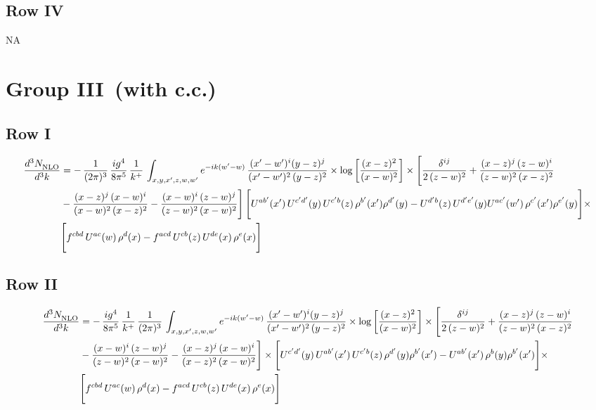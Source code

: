 \documentclass[9pt]{article}
\numberwithin{equation}{section}
\begin{document}
\subsection{Row IV}
\textsc{NA}
\section{Group III\, (with c.c.)}
\subsection{Row I}
\begin{align}
     \frac{d^{3}N_{\rm NLO}^{\rm}}{d^{3}k}  & =   -\,\frac{1}{(2\pi)^{3}}\, \frac{ig^{4}}{8\pi^{5}}\,\frac{1}{k^{+}}\,\int_{x,y,x',z,w,w^{\prime}} e^{-ik(w^{\prime}-w)}\,\frac{(x'-w')^{i}(y-z)^{j}}{(x'-w')^{2}\,(y-z)^{2}}\times \log{\left[\frac{(x-z)^{2}}{(x-w)^{2}}\right]}\times \Bigg[\frac{\delta^{ij}}{2\,(z-w)^{2}}+\frac{(x-z)^{j}\,(z-w)^{i}}{(z-w)^{2}\,(x-z)^{2}}\notag \\ & -\frac{(x-z)^{j}\,(x-w)^{i}}{(x-w)^{2}\,(x-z)^{2}}-\frac{(x-w)^{i}\,(z-w)^{j}}{(z-w)^{2}\,(x-w)^{2}}\Bigg]\, \Bigg[U^{ab'}(x')\,U^{c'd'}(y)\,U^{c'b}(z)\,\rho^{b'}(x')\rho^{d'}(y)-U^{d'b}(z)\,U^{d'e'}(y)U^{ac'}(w')\,\rho^{c'}(x')\rho^{e'}(y)\Bigg]\times\notag \\ & \Bigg[f^{cbd}\,U^{ac}(w)\,\rho^{d}(x)-f^{acd}\, U^{cb}(z)\,U^{de}(x)\,\rho^{e}(x)\Bigg]
\end{align}
\subsection{Row II}
\begin{align}
     \frac{d^{3}N_{\rm NLO}^{\rm}}{d^{3}k}  & =    
 -\,\frac{ig^{4}}{8\pi^{5}}\,\frac{1}{k^{+}}\,\frac{1}{(2\pi)^{3}}\, \int_{x,y,x',z,w,w^{\prime}} e^{-ik(w^{\prime}-w)}\,\frac{(x'-w')^{i}(y-z)^{j}}{(x'-w')^{2}\,(y-z)^{2}}\times \log{\left[\frac{(x-z)^{2}}{(x-w)^{2}}\right]}\times \Bigg[\frac{\delta^{ij}}{2\,(z-w)^{2}}+\frac{(x-z)^{j}\,(z-w)^{i}}{(z-w)^{2}\,(x-z)^{2}}\notag \\ & -\frac{(x-w)^{i}\,(z-w)^{j}}{(z-w)^{2}\,(x-w)^{2}}-\frac{(x-z)^{j}\,(x-w)^{i}}{(x-z)^{2}\,(x-w)^{2}}\Bigg]\times \Bigg[U^{c'd'}(y)\,U^{ab'}(x')\,U^{c'b}(z)\,\rho^{d'}(y)\rho^{b'}(x')-U^{ab'}(x')\,\rho^{b}(y)\rho^{b'}(x')\Bigg]\times\notag \\ & \Bigg[f^{cbd}\,U^{ac}(w)\,\rho^{d}(x)-f^{acd}\, U^{cb}(z)\,U^{de}(x)\,\rho^{e}(x)\Bigg]
\end{align}
\end{document}
